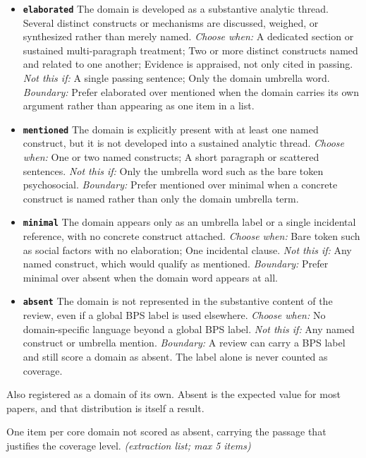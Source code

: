 \documentclass[11pt]{article}
\begin{document}
\begin{description}
  \begin{itemize}[leftmargin=1.3em,itemsep=2pt,topsep=2pt]
  \item \textbf{\texttt{elaborated}} The domain is developed as a substantive analytic thread. Several distinct constructs or mechanisms are discussed, weighed, or synthesized rather than merely named. {\small \textit{Choose when:} A dedicated section or sustained multi-paragraph treatment; Two or more distinct constructs named and related to one another; Evidence is appraised, not only cited in passing. \textit{Not this if:} A single passing sentence; Only the domain umbrella word. \textit{Boundary:} Prefer elaborated over mentioned when the domain carries its own argument rather than appearing as one item in a list.}
  \item \textbf{\texttt{mentioned}} The domain is explicitly present with at least one named construct, but it is not developed into a sustained analytic thread. {\small \textit{Choose when:} One or two named constructs; A short paragraph or scattered sentences. \textit{Not this if:} Only the umbrella word such as the bare token psychosocial. \textit{Boundary:} Prefer mentioned over minimal when a concrete construct is named rather than only the domain umbrella term.}
  \item \textbf{\texttt{minimal}} The domain appears only as an umbrella label or a single incidental reference, with no concrete construct attached. {\small \textit{Choose when:} Bare token such as social factors with no elaboration; One incidental clause. \textit{Not this if:} Any named construct, which would qualify as mentioned. \textit{Boundary:} Prefer minimal over absent when the domain word appears at all.}
  \item \textbf{\texttt{absent}} The domain is not represented in the substantive content of the review, even if a global BPS label is used elsewhere. {\small \textit{Choose when:} No domain-specific language beyond a global BPS label. \textit{Not this if:} Any named construct or umbrella mention. \textit{Boundary:} A review can carry a BPS label and still score a domain as absent. The label alone is never counted as coverage.}
  \end{itemize}
{\small Also registered as a domain of its own. Absent is the expected value for most papers, and that distribution is itself a result.}
\item[\texttt{domain\_evidence}] One item per core domain not scored as absent, carrying the passage that justifies the coverage level. \textit{(extraction list; max 5 items)}

\end{description}
\end{document}

